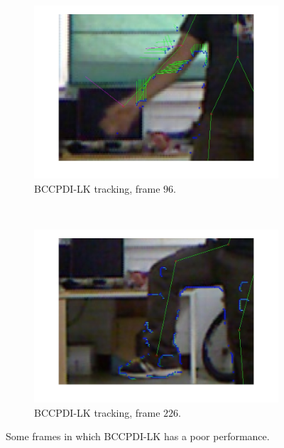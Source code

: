\begin{figure}[t]
        \begin{subfigure}[b]{0.45\textwidth}
                \centering
                \includegraphics[width=\textwidth, trim=0 0 0 0,clip]{fig32.jpg}
                \caption{BCCPDI-LK tracking, frame $96$.}
                \label{fig:cp02_comparison_oflow_fails_elbow_lk_side}
        \end{subfigure}%
        ~
        \begin{subfigure}[b]{0.45\textwidth}
                \centering
                \includegraphics[width=\textwidth, trim=0 0 0 0,clip]{fig33.jpg}
                \caption{BCCPDI-LK tracking, frame $226$.}
                \label{fig:cp02_comparison_oflow_fails_knee_lk_side}
        \end{subfigure}%

        \caption{Some frames in which BCCPDI-LK has a poor performance.}\label{fig:cp02_comparison}
\end{figure}

